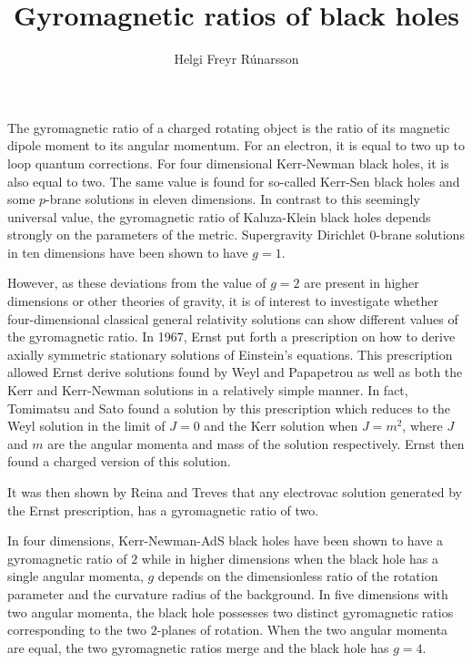 \documentclass[a4paper]{article}
\title{Gyromagnetic ratios of black holes}
\author{Helgi Freyr R\'{u}narsson}
\begin{document}
\maketitle

The gyromagnetic ratio of a charged rotating object is the ratio of its magnetic dipole moment to its angular momentum.
For an electron, it is equal to two up to loop quantum corrections.
For four dimensional Kerr-Newman black holes, it is also equal to two\cite{Carter:1968rr}.
The same value is found for so-called Kerr-Sen black holes\cite{Sen:1992ua} and some $p$-brane solutions in eleven dimensions\cite{Balasubramanian:1998za}.
In contrast to this seemingly universal value, the gyromagnetic ratio of Kaluza-Klein black holes depends strongly on the parameters of the metric\cite{Larsen:1999pp}.
Supergravity Dirichlet $0$-brane solutions in ten dimensions have been shown to have $g=1$\cite{Ardalan:1998ce}.

However, as these deviations from the value of $g=2$ are present in higher dimensions or other theories of gravity, it is of interest to investigate whether four-dimensional classical general relativity solutions can show different values of the gyromagnetic ratio.
In 1967, Ernst put forth a prescription on how to derive axially symmetric stationary solutions of Einstein's equations\cite{Ernst:1967wx,Ernst:1967by}.
This prescription allowed Ernst derive solutions found by Weyl\cite{Weyl:1917gp} and Papapetrou\cite{Papapetrou:1953zz} as well as both the Kerr and Kerr-Newman solutions in a relatively simple manner.
In fact, Tomimatsu and Sato found a solution by this prescription which reduces to the Weyl solution in the limit of $J=0$ and the Kerr solution when $J=m^2$, where $J$ and $m$ are the angular momenta and mass of the solution respectively.\cite{Tomimatsu:1972zz}
Ernst then found a charged version of this solution\cite{PhysRevD.7.2520}.

It was then shown by Reina and Treves that any electrovac solution generated by the Ernst prescription, has a gyromagnetic ratio of two.\cite{Reina:1975rt}

In four dimensions, Kerr-Newman-AdS black holes have been shown to have a gyromagnetic ratio of $2$\cite{Aliev:2007qi} while in higher dimensions when the black hole has a single angular momenta, $g$ depends on the dimensionless ratio of the rotation parameter and the curvature radius of the background.
In five dimensions with two angular momenta, the black hole possesses two distinct gyromagnetic ratios corresponding to the two $2$-planes of rotation.
When the two angular momenta are equal, the two gyromagnetic ratios merge and the black hole has $g=4$\cite{Aliev:2007qi}.
\end{document}
